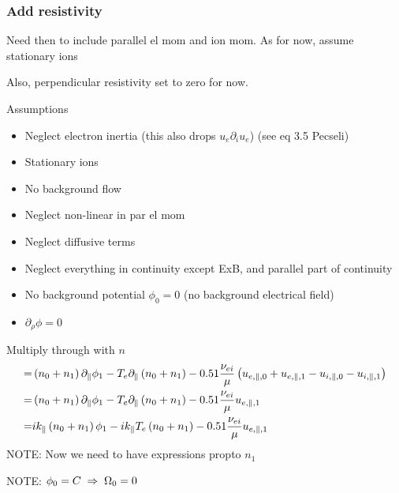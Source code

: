 \subsubsection{Add resistivity}
Need then to include parallel el mom and ion mom. As for now, assume stationary ions

Also, perpendicular resistivity set to zero for now.

Assumptions
\begin{itemize}
    \item Neglect electron inertia (this also drops $u_e \partial_i u_e$) (see eq 3.5 Pecseli)
    \item Stationary ions
    \item No background flow
    \item Neglect non-linear in par el mom
    \item Neglect diffusive terms
    \item Neglect everything in continuity except ExB, and parallel part of continuity
    \item No background potential $\phi_0 = 0$ (no background electrical field)
    \item $\partial_\rho\phi = 0$
\end{itemize}
Multiply through with $n$
\begin{align*}
%
=&
\L( n_0 + n_1\R)\partial_\| \phi_1
-
T_e \partial_\| \L( n_0 + n_1 \R)
  - 0.51 \frac{\nu_{ei}}{\mu }
  \L( u_{e,\|,0} + u_{e,\|,1} - u_{i,\|,0} - u_{i,\|,1} \R)
  \\
=&
\L( n_0 + n_1\R)\partial_\| \phi_1
-
T_e \partial_\| \L( n_0 + n_1 \R)
  - 0.51 \frac{\nu_{ei}}{\mu } u_{e,\|,1}
  \\
=&
ik_\|\L( n_0 + n_1\R) \phi_1
-
ik_\|T_e \L( n_0 + n_1 \R)
  - 0.51 \frac{\nu_{ei}}{\mu }  u_{e,\|,1}
\end{align*}
NOTE: Now we need to have expressions propto $n_1$

NOTE: $\phi_0=C \; \Rightarrow \; \Omega_0 = 0$

